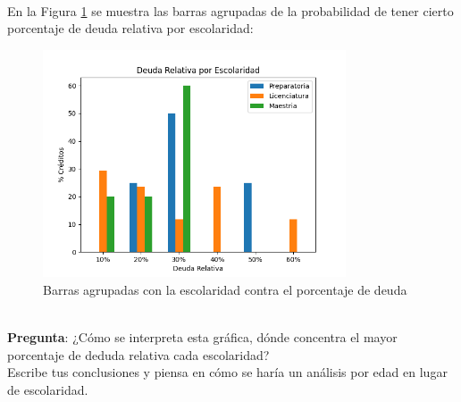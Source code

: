 \documentclass{article}
\begin{document}
\clearpage

\hfill\\
En la Figura \ref{fig:escolaridad_deuda_bar} se muestra las barras agrupadas de la probabilidad de tener cierto porcentaje de deuda relativa por escolaridad:
\begin{figure}[h]
    \centering
    \includegraphics[width=0.8\textwidth]{figures/escolaridad_deuda_bar.png}
    \captionsetup{width=\textwidth}
    \caption{Barras agrupadas con la escolaridad contra el porcentaje de deuda}
    \label{fig:escolaridad_deuda_bar}
\end{figure}
\\[12pt]
\textbf{Pregunta}: ¿Cómo se interpreta esta gráfica, dónde concentra el mayor porcentaje de deduda relativa cada escolaridad?
\\[12pt]
Escribe tus conclusiones y piensa en cómo se haría un análisis por edad en lugar de escolaridad.
\end{document}
